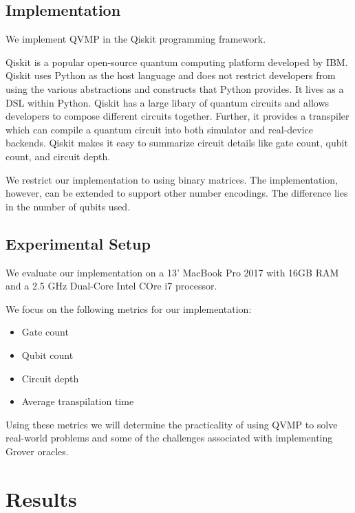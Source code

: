 \documentclass[10pt]{proc}
\theoremstyle{definition}
\theoremstyle{remark}
\begin{document}
\subsection{Implementation}

We implement QVMP in the Qiskit programming framework.

Qiskit is a popular open-source quantum computing platform developed by IBM.
Qiskit uses Python as the host language and does not restrict developers from
using the various abstractions and constructs that Python provides. It lives as
a DSL within Python. Qiskit has a large libary of quantum circuits and allows
developers to compose different circuits together. Further, it provides a
transpiler which can compile a quantum circuit into both simulator and
real-device backends. Qiskit makes it easy to summarize circuit details like
gate count, qubit count, and circuit depth.

We restrict our implementation to using binary matrices. The implementation,
however, can be extended to support other number encodings. The difference lies
in the number of qubits used.


\subsection{Experimental Setup}

We evaluate our implementation on a 13' MacBook Pro 2017 with 16GB RAM and a 2.5 GHz Dual-Core Intel COre i7 processor.

We focus on the following metrics for our implementation: 
\begin{itemize}
  \item Gate count
  \item Qubit count
  \item Circuit depth
  \item Average transpilation time
\end{itemize}

Using these metrics we will determine the practicality of using QVMP to
solve real-world problems and some of the challenges associated with
implementing Grover oracles.

\section{Results}
\end{document}
